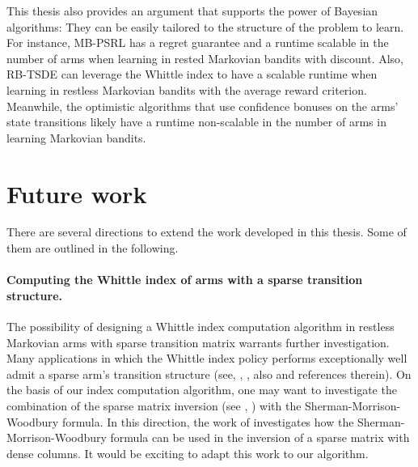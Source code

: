 This thesis also provides an argument that supports the power of Bayesian algorithms: They can be easily tailored to the structure of the problem to learn.
For instance, MB-PSRL has a regret guarantee and a runtime scalable in the number of arms when learning in rested Markovian bandits with discount.
Also, RB-TSDE \cite{akbarzadeh2022learning} can leverage the Whittle index to have a scalable runtime when learning in restless Markovian bandits with the average reward criterion.
Meanwhile, the optimistic algorithms that use confidence bonuses on the arms' state transitions likely have a runtime non-scalable in the number of arms in learning Markovian bandits.

\section{Future work}

There are several directions to extend the work developed in this thesis. Some of them are outlined in the following.

\paragraph{Computing the Whittle index of arms with a sparse transition structure.}
The possibility of designing a Whittle index computation algorithm in restless Markovian arms with sparse transition matrix warrants further investigation.
Many applications in which the Whittle index policy performs exceptionally well admit a sparse arm's transition structure (see, \eg, \cite{wang1995finite, nino2002dynamic, aalto2018whittle}, also \cite{wang2020restless} and references therein).
On the basis of our index computation algorithm, one may want to investigate the combination of the sparse matrix inversion (see \eg, \cite{dulmage1962inversion, niessner1983computing}) with the Sherman-Morrison-Woodbury formula.
In this direction, the work of \cite{vanderbei1991splitting} investigates how the Sherman-Morrison-Woodbury formula can be used in the inversion of a sparse matrix with dense columns.
It would be exciting to adapt this work to our algorithm.

